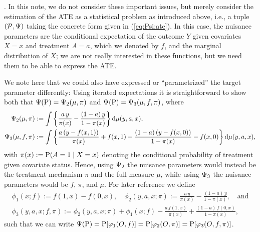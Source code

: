 \documentclass[a4,danish]{article}
\begin{document}
. In this note, we do
not consider these important issues, but merely consider the estimation of the ATE as a statistical
problem as introduced above, i.e., a tuple $(\mathcal{P}, \TT)$ taking the concrete form given in
(\ref{eq:Psi:ate}). In this case, the nuisance parameters are the conditional expectation of the
outcome $Y$ given covariates $X=x$ and treatment $A=a$, which we denoted by $f$, and the marginal
distribution of $X$; we are not really interested in these functions, but we need them to be able to
express the ATE.

We note here that we could also have expressed or ``parametrized'' the target parameter differently:
Using iterated expectations it is straightforward to show both that $\TT(\P) = \TT_2(\mu, \pi)$ and
$\TT(\P) = \TT_3(\mu, f, \pi)$, where
\begin{align*}
  \TT_2(\mu, \pi) & := \int 
                    \left\{
                    \frac{a\,y}{\pi(x)} - \frac{(1-a)\,y}{1-\pi(x)} 
                    \right\}\diff \mu(y,a,x),\\
  \TT_3(\mu, f, \pi) &:=
                       \int 
                       \left\{
                       \frac{a\,(y-f(x,1))}{\pi(x)} + f(x,1) - \frac{(1-a)\,(y-f(x,0))}{1-\pi(x)} - f(x,0)
                       \right\}\diff \mu(y,a,x),
\end{align*}
with $\pi(x) := \P(A=1 \mid X=x)$ denoting the conditional probability of treatment given covariate
status. Hence, using $\TT_2$ the nuisance parameters would instead be the treatment mechanism $\pi$
and the full measure $\mu$, while using $\TT_3$ the nuisance parameters would be $f$, $\pi$, and
$\mu$. For later reference we define
\begin{equation}
  \label{eq:ate-pars}
  \begin{gathered}
    \phi_1(x; f) := f(1,x) - f(0,x), \quad
    \phi_2(y,a,x; \pi) := \frac{a\,y}{\pi(x)} - \frac{(1-a)\,y}{1-\pi(x)},\quad \text{and}  \\
    \phi_3(y,a,x; f, \pi) := \phi_2(y,a,x; \pi) + \phi_1(x; f) - \frac{a\,f(1,x)}{\pi(x)} +
    \frac{(1-a)\,f(0,x)}{1-\pi(x)},
  \end{gathered}
\end{equation}
such that we can write $\TT(\P) = \P[\phi_1(O, f)] = \P[\phi_2(O, \pi)] = \P[\phi_3(O, f, \pi)]$.
\end{document}
